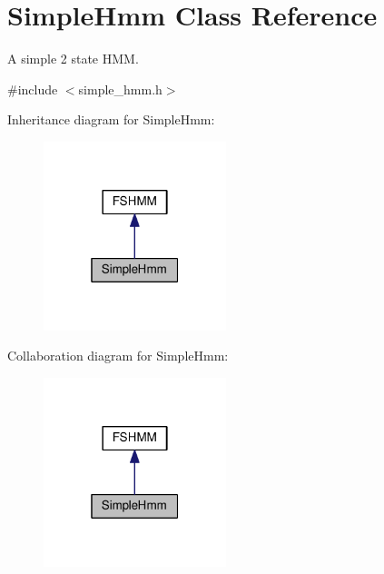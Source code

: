 \hypertarget{classSimpleHmm}{}\section{Simple\+Hmm Class Reference}
\label{classSimpleHmm}


A simple 2 state H\+MM.  




{\ttfamily \#include $<$simple\+\_\+hmm.\+h$>$}



Inheritance diagram for Simple\+Hmm\+:\nopagebreak
\begin{figure}[H]
\begin{center}
\leavevmode
\includegraphics[width=151pt]{classSimpleHmm__inherit__graph}
\end{center}
\end{figure}


Collaboration diagram for Simple\+Hmm\+:\nopagebreak
\begin{figure}[H]
\begin{center}
\leavevmode
\includegraphics[width=151pt]{classSimpleHmm__coll__graph}
\end{center}
\end{figure}
